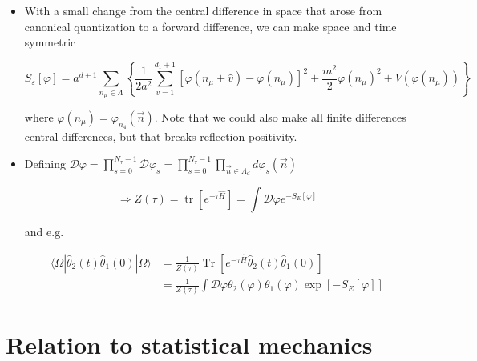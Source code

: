 \begin{itemize}
  \item With a small change from the central difference in space that arose from canonical quantization to a forward difference, we can make space and time symmetric

\begin{equation}
S_{\varepsilon}[\varphi]=a^{d+1} \sum_{n_{\mu} \in \Lambda}\left\{\frac{1}{2 a^{2}} \sum_{v=1}^{d_{1}+1}\left[\varphi\left(n_{\mu}+\hat{v}\right)-\varphi\left(n_{\mu}\right)\right]^{2}+\frac{m^{2}}{2} \varphi\left(n_{\mu}\right)^{2}+V\left(\varphi\left(n_{\mu}\right)\right)\right\}
\label{eq:scalar_euclidean_action}
\end{equation}

where \(\varphi\left(n_{\mu}\right)=\varphi_{n_{4}}(\vec{n})\). Note that we could also make all finite differences central differences, but that breaks reflection positivity.

  \item Defining \(\mathcal{D} \varphi=\prod_{s=0}^{N_{\tau}-1} \mathcal{D} \varphi_{s}=\prod_{s=0}^{N_{\tau}-1} \prod_{\vec{n}\in\Lambda_d} d \varphi_{s}(\vec{n})\)

\begin{equation}
\Rightarrow Z(\tau)=\operatorname{tr}\left[e^{-\tau \hat{H}}\right]=\int \mathcal{D} \varphi e^{-S_{E}[\varphi]}
\end{equation}

and e.g.

\begin{equation}
\begin{aligned}
    \langle\Omega| \hat{\theta}_{2}(t) \hat{\theta}_{1}(0)|\Omega\rangle &=\frac{1}{Z(\tau)} \operatorname{Tr}\left[e^{-\tau \hat{H}} \hat{\theta}_{2}(t) \hat{\theta}_{1}(0)\right] \\
&=\frac{1}{Z({\tau})} \int \mathcal{D} \varphi \theta_{2}(\varphi) \theta_{1}(\varphi) \exp \left[-S_{E}[\varphi]\right]
\end{aligned}
\end{equation}

\end{itemize}

\section{Relation to statistical mechanics}

